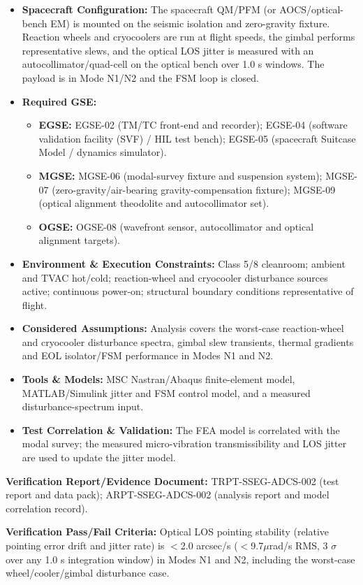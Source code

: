 \begin{itemize}
\item \textbf{Spacecraft Configuration:} The spacecraft QM/PFM (or AOCS/optical-bench EM) is mounted on the seismic isolation and zero-gravity fixture. Reaction wheels and cryocoolers are run at flight speeds, the gimbal performs representative slews, and the optical LOS jitter is measured with an autocollimator/quad-cell on the optical bench over 1.0 s windows. The payload is in Mode N1/N2 and the FSM loop is closed.
\item \textbf{Required GSE:}
\begin{itemize}
\item \textbf{EGSE:} EGSE-02 (TM/TC front-end and recorder); EGSE-04 (software validation facility (SVF) / HIL test bench); EGSE-05 (spacecraft Suitcase Model / dynamics simulator).
\item \textbf{MGSE:} MGSE-06 (modal-survey fixture and suspension system); MGSE-07 (zero-gravity/air-bearing gravity-compensation fixture); MGSE-09 (optical alignment theodolite and autocollimator set).
\item \textbf{OGSE:} OGSE-08 (wavefront sensor, autocollimator and optical alignment targets).
\end{itemize}
\item \textbf{Environment \& Execution Constraints:} Class 5/8 cleanroom; ambient and TVAC hot/cold; reaction-wheel and cryocooler disturbance sources active; continuous power-on; structural boundary conditions representative of flight.
\item \textbf{Considered Assumptions:} Analysis covers the worst-case reaction-wheel and cryocooler disturbance spectra, gimbal slew transients, thermal gradients and EOL isolator/FSM performance in Modes N1 and N2.
\item \textbf{Tools \& Models:} MSC Nastran/Abaqus finite-element model, MATLAB/Simulink jitter and FSM control model, and a measured disturbance-spectrum input.
\item \textbf{Test Correlation \& Validation:} The FEA model is correlated with the modal survey; the measured micro-vibration transmissibility and LOS jitter are used to update the jitter model.
\end{itemize}
\par\textbf{Verification Report/Evidence Document:} TRPT-SSEG-ADCS-002 (test report and data pack); ARPT-SSEG-ADCS-002 (analysis report and model correlation record).
\par\textbf{Verification Pass/Fail Criteria:} Optical LOS pointing stability (relative pointing error drift and jitter rate) is $<$2.0 arcsec/s ($<$9.7$\mu$rad/s RMS, 3 $\sigma$ over any 1.0 s integration window) in Modes N1 and N2, including the worst-case wheel/cooler/gimbal disturbance case.
\par\medskip

